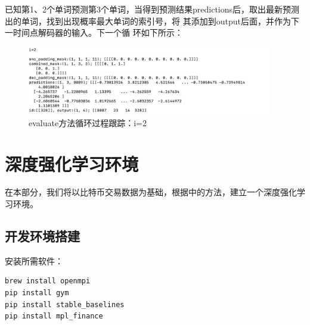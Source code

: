 \documentclass{article}
\begin{document}
已知第1、2个单词预测第3个单词，当得到预测结果predictions后，取出最新预测出的单词，找到出现概率最大单词的索引号，将
其添加到output后面，并作为下一时间点解码器的输入。下一个循
环如下所示：
\begin{figure}[H]
    \caption{evaluate方法循环过程跟踪：i=2}
    \label{f000090}
    \centering
    \includegraphics[height=3cm]{images/f000090}
\end{figure}


    
    











\section{深度强化学习环境}
在本部分，我们将以比特币交易数据为基础，根据\cite{r000007}中的方法，建立一个深度强化学习环境。
\subsection{开发环境搭建}
安装所需软件：
\lstset{language=BASH}
\begin{lstlisting}
brew install openmpi
pip install gym
pip install stable_baselines
pip install mpl_finance
\end{lstlisting}
\end{document}
